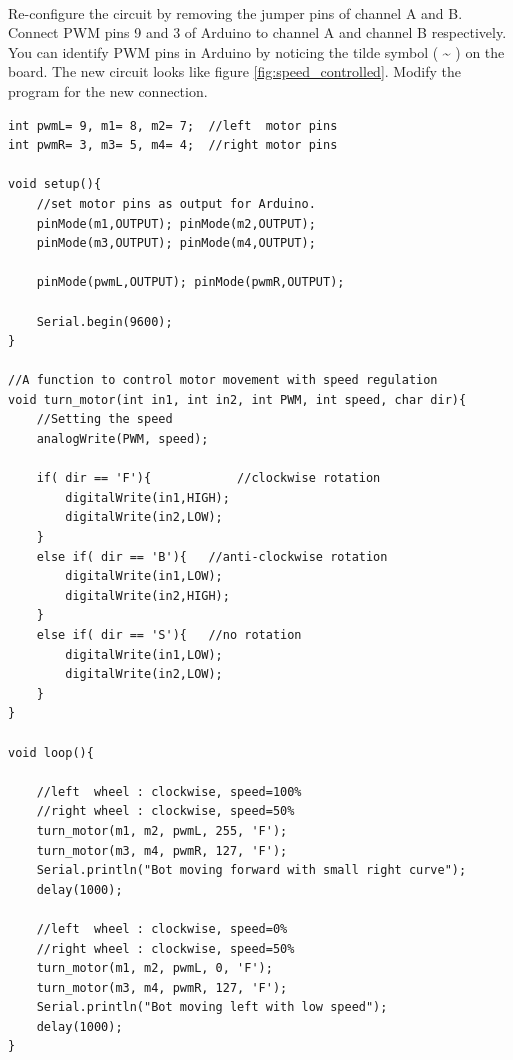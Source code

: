 \paragraph{ } Re-configure the circuit by removing the jumper pins of channel A and B. Connect \ac{PWM} pins 9 and 3 of Arduino to channel A and channel B respectively. You can identify \ac{PWM} pins in Arduino by noticing the tilde symbol ( \textasciitilde{} ) on the board. The new circuit looks like figure \ref{fig:speed_controlled}. Modify the program for the new connection.

\begin{lstlisting}[style=CStyle]
int pwmL= 9, m1= 8, m2= 7;  //left  motor pins
int pwmR= 3, m3= 5, m4= 4;  //right motor pins

void setup(){
    //set motor pins as output for Arduino.
    pinMode(m1,OUTPUT); pinMode(m2,OUTPUT); 
    pinMode(m3,OUTPUT); pinMode(m4,OUTPUT);
    
    pinMode(pwmL,OUTPUT); pinMode(pwmR,OUTPUT);
    
    Serial.begin(9600);
}

//A function to control motor movement with speed regulation
void turn_motor(int in1, int in2, int PWM, int speed, char dir){
    //Setting the speed
    analogWrite(PWM, speed);
    
    if( dir == 'F'){			//clockwise rotation
        digitalWrite(in1,HIGH);
        digitalWrite(in2,LOW);
    }
    else if( dir == 'B'){	//anti-clockwise rotation
        digitalWrite(in1,LOW);
        digitalWrite(in2,HIGH);
    }
    else if( dir == 'S'){	//no rotation
        digitalWrite(in1,LOW);
        digitalWrite(in2,LOW);
    }
}

void loop(){

    //left  wheel : clockwise, speed=100%
    //right wheel : clockwise, speed=50%
    turn_motor(m1, m2, pwmL, 255, 'F');  
    turn_motor(m3, m4, pwmR, 127, 'F');
    Serial.println("Bot moving forward with small right curve");
    delay(1000);
    
    //left  wheel : clockwise, speed=0%
    //right wheel : clockwise, speed=50%
    turn_motor(m1, m2, pwmL, 0, 'F');    
    turn_motor(m3, m4, pwmR, 127, 'F');  
    Serial.println("Bot moving left with low speed");
    delay(1000);
}
\end{lstlisting}

